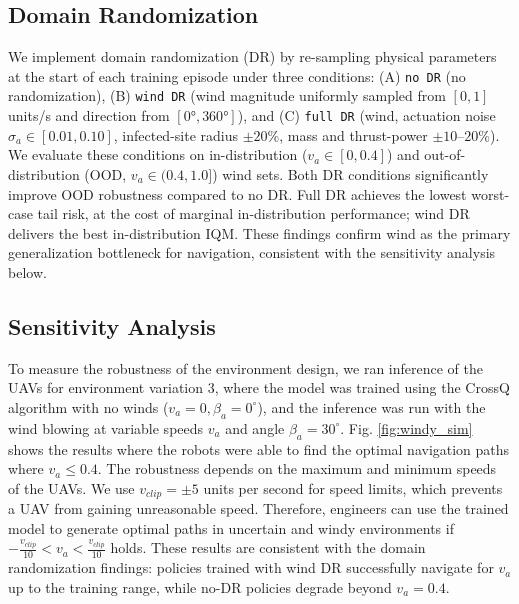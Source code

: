\documentclass[letterpaper, 10 pt, conference]{ieeeconf}  %
\begin{document}
\subsection{Domain Randomization}
\label{sec:dr}
We implement domain randomization (DR) by re-sampling physical parameters at the start of each training episode under three conditions: (A) \texttt{no DR} (no randomization), (B) \texttt{wind DR} (wind magnitude uniformly sampled from $[0, 1]$\,units/s and direction from $[0°, 360°]$), and (C) \texttt{full DR} (wind, actuation noise $\sigma_a \in [0.01, 0.10]$, infected-site radius $\pm 20\%$, mass and thrust-power $\pm 10$--$20\%$). We evaluate these conditions on in-distribution ($v_a \in [0, 0.4]$) and out-of-distribution (OOD, $v_a \in (0.4, 1.0]$) wind sets. Both DR conditions significantly improve OOD robustness compared to no DR. Full DR achieves the lowest worst-case tail risk, at the cost of marginal in-distribution performance; wind DR delivers the best in-distribution IQM. These findings confirm wind as the primary generalization bottleneck for navigation, consistent with the sensitivity analysis below.

\subsection{Sensitivity Analysis}
To measure the robustness of the environment design, we ran inference of the UAVs for environment variation 3, where the model was trained using the CrossQ algorithm with no winds ($v_a = 0, \beta_a = 0^{\circ}$), and the inference was run with the wind blowing at variable speeds $v_a$ and angle $\beta_a=30^{\circ}$. Fig. \ref{fig:windy_sim} shows the results where the robots were able to find the optimal navigation paths where $v_a \leq 0.4$. The robustness depends on the maximum and minimum speeds of the UAVs. We use $v_{clip} = \pm 5$ units per second for speed limits, which prevents a UAV from gaining unreasonable speed. Therefore, engineers can use the trained model to generate optimal paths in uncertain and windy environments if $-\frac{v_{clip}}{10} < v_a < \frac{v_{clip}}{10}$ holds. These results are consistent with the domain randomization findings: policies trained with wind DR successfully navigate for $v_a$ up to the training range, while no-DR policies degrade beyond $v_a = 0.4$.
\end{document}
